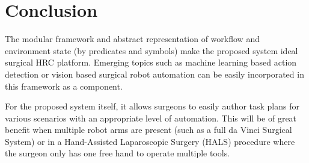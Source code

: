 \documentclass[letterpaper, 10 pt, conference]{ieeeconf}
\begin{document}
\section{Conclusion}
The modular framework and abstract representation of workflow and environment state (by predicates and symbols) make the proposed system ideal surgical HRC platform. Emerging topics such as machine learning based action detection or vision based surgical robot automation can be easily incorporated in this framework as a component. 

For the proposed system itself, it allows surgeons to easily author task plans for various scenarios with an appropriate level of automation. This will be of great benefit when multiple robot arms are present (such as a full da Vinci Surgical System) or in a Hand-Assisted Laparoscopic Surgery (HALS) procedure \cite{bauzano2016collaborative} where the surgeon only has one free hand to operate multiple tools. 


\addtolength{\textheight}{-12cm}   %







%






\end{document}
